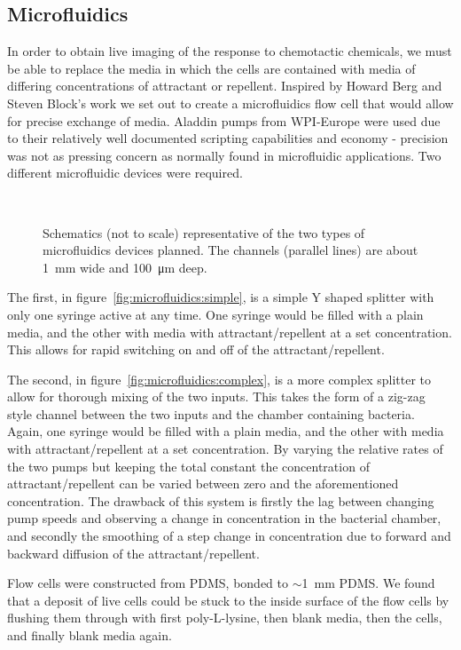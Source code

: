 \documentclass[../main.tex]{subfiles}
\begin{document}
\subsection{Microfluidics}

In order to obtain live imaging of the response to chemotactic chemicals, we must be able to replace the media in which the cells are contained with media of differing concentrations of attractant or repellent. Inspired by Howard Berg and Steven Block's work\citep{berg84} we set out to create a microfluidics flow cell that would allow for precise exchange of media. Aladdin pumps from WPI-Europe were used due to their relatively well documented scripting capabilities and economy - precision was not as pressing concern as normally found in microfluidic applications. Two different microfluidic devices were required.

\begin{figure}[h!]
\begin{center}
\\
\caption[Microfluidics devices]{Schematics (not to scale) representative of the two types of microfluidics devices planned. The channels (parallel lines) are about \SI{1}{\milli\meter} wide and \SI{100}{\micro\meter} deep.}
\label{fig:microfluidics}
\end{center}
\end{figure}

The first, in figure~\ref{fig:microfluidics:simple}, is a simple Y shaped splitter with only one syringe active at any time. One syringe would be filled with a plain media, and the other with media with attractant/repellent at a set concentration. This allows for rapid switching on and off of the attractant/repellent.

The second, in figure~\ref{fig:microfluidics:complex}, is a more complex splitter to allow for thorough mixing of the two inputs. This takes the form of a zig-zag style channel between the two inputs and the chamber containing bacteria. Again, one syringe would be filled with a plain media, and the other with media with attractant/repellent at a set concentration. By varying the relative rates of the two pumps but keeping the total constant the concentration of attractant/repellent can be varied between zero and the aforementioned concentration. The drawback of this system is firstly the lag between changing pump speeds and observing a change in concentration in the bacterial chamber, and secondly the smoothing of a step change in concentration due to forward and backward diffusion of the attractant/repellent.

Flow cells were constructed from PDMS, bonded to \(\sim\)\SI{1}{\milli\meter} PDMS. We found that a deposit of live cells could be stuck to the inside surface of the flow cells by flushing them through with first poly-L-lysine, then blank media, then the cells, and finally blank media again.
\end{document}
